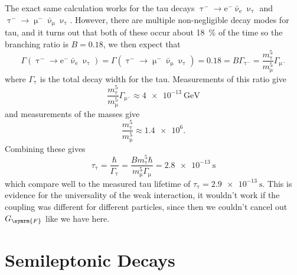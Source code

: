 \documentclass[fleqn]{NotesClass}
\newcommand{\Pparticle}[1]{\mathrm{#1}}
\newcommand{\Pe}{\ensuremath{\Pparticle{e}^{-}}}
\newcommand{\Pmu}{\ensuremath{\upmu^{-}}}
\newcommand{\Pmux}{\ensuremath{\upmu}}
\newcommand{\Ptau}{\ensuremath{\uptau^{-}}}
\newcommand{\Ptaux}{\ensuremath{\uptau}}
\newcommand{\Pnutau}{\ensuremath{\upnu_{\uptau}}}
\newcommand{\APantiparticle}[1]{\bar{#1}}
\newcommand{\APnue}{\ensuremath{\APantiparticle{\upnu}_{\mathrm{e}}}}
\newcommand{\APnumu}{\ensuremath{\APantiparticle{\upnu}_{\text{μ}}}}
\newcommand{\fermiConst}{G_{\symrm{F}}}
\begin{document}
    The exact same calculation works for the tau decays \(\Ptau \to \Pe\APnue\Pnutau\) and \(\Ptau \to \Pmu\APnumu\Pnutau\).
    However, there are multiple non-negligible decay modes for tau, and it turns out that both of these occur about \qty{18}{\percent} of the time so the branching ratio is \(B = 0.18\), we then expect that
    \begin{equation}
        \Gamma(\Ptau \to \Pe\APnue\Pnutau) = \Gamma(\Ptau \to \Pmu\APnumu\Pnutau) = 0.18 = B\Gamma_{\Ptau} = \frac{m_{\Ptaux}^5}{m_{\Pmux}^5} \Gamma_{\Pmu}
    \end{equation}
    where \(\Gamma_{\Ptaux}\) is the total decay width for the tau.
    Measurements of this ratio give
    \begin{equation}
        \frac{m_{\Ptaux}^5}{m_{\Pmux}^5} \Gamma_{\Pmu} \approx \qty{4e-13}{\giga\electronvolt}
    \end{equation}
    and measurements of the masses give
    \begin{equation}
        \frac{m_{\Ptaux}^5}{m_{\Pmux}^5} \approx \num{1.4e6}.
    \end{equation}
    Combining these gives
    \begin{equation}
        \tau_{\Ptaux} = \frac{\hbar}{\Gamma_{\Ptaux}} = \frac{Bm_{\Ptaux}^5\hbar}{m_{\Pmux}^5 \Gamma_{\Pmux}} = \qty{2.8e-13}{\second}
    \end{equation}
    which compare well to the measured tau lifetime of \(\tau_{\Ptaux} = \qty{2.9e-13}{\second}\).
    This is evidence for the universality of the weak interaction, it wouldn't work if the coupling was different for different particles, since then we couldn't cancel out \(\fermiConst\) like we have here.
    
    \chapter{Semileptonic Decays}
\end{document}
